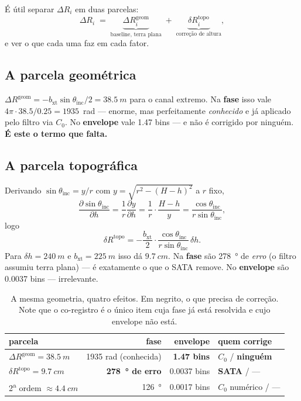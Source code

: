 \documentclass[11pt,a4paper]{article}
\newcommand{\bxt}{b_{\mathrm{xt}}}
\newcommand{\thi}{\theta_{\mathrm{inc}}}
\begin{document}
É útil separar $\Delta R_i$ em duas parcelas:
\begin{equation}
\Delta R_i \;=\;
\underbrace{\Delta R_i^{\mathrm{geom}}}_{\text{baseline, terra plana}}
\;+\;
\underbrace{\delta R_i^{\mathrm{topo}}}_{\text{correção de altura}},
\end{equation}
e ver o que cada uma faz em cada fator.

\subsection{A parcela geométrica}

$\Delta R^{\mathrm{geom}} = -\bxt\sin\thi/2 = \SI{38.5}{m}$ para o canal
extremo. Na \textbf{fase} isso vale
$4\pi\cdot\num{38.5}/\num{0.25} = \num{1935}$~rad --- enorme, mas
perfeitamente \emph{conhecido} e já aplicado pelo filtro via $C_0$. No
\textbf{envelope} vale \num{1.47} bins --- e não é corrigido por ninguém.
\textbf{É este o termo que falta.}

\subsection{A parcela topográfica}

Derivando $\sin\thi = y/r$ com $y = \sqrt{r^2-(H-h)^2}$ a $r$ fixo,
\begin{equation}
\frac{\partial \sin\thi}{\partial h}
= \frac{1}{r}\frac{\partial y}{\partial h}
= \frac{1}{r}\cdot\frac{H-h}{y}
= \frac{\cos\thi}{r\sin\thi},
\end{equation}
logo
\begin{equation}
\delta R^{\mathrm{topo}}
= -\frac{\bxt}{2}\cdot\frac{\cos\thi}{r\sin\thi}\,\delta h .
\label{eq:topo}
\end{equation}
Para $\delta h = \SI{240}{m}$ e $\bxt = \SI{225}{m}$ isso dá
$\SI{9.7}{cm}$. Na \textbf{fase} são \SI{278}{\degree} de \emph{erro} (o
filtro assumiu terra plana) --- é exatamente o que o SATA remove. No
\textbf{envelope} são \num{0.0037} bins --- irrelevante.

\begin{table}[h]
\centering
\begin{tabular}{lrrl}
\toprule
parcela & fase & envelope & quem corrige \\
\midrule
$\Delta R^{\mathrm{geom}} = \SI{38.5}{m}$ & \num{1935} rad (conhecida) & \textbf{\num{1.47} bins} & $C_0$ / \textbf{ninguém} \\
$\delta R^{\mathrm{topo}} = \SI{9.7}{cm}$ & \textbf{\SI{278}{\degree} de erro} & \num{0.0037} bins & \textbf{SATA} / --- \\
2\textsuperscript{a} ordem $\approx \SI{4.4}{cm}$ & \SI{126}{\degree} & \num{0.0017} bins & $C_0$ numérico / --- \\
\bottomrule
\end{tabular}
\caption{A mesma geometria, quatro efeitos. Em negrito, o que precisa de
correção. Note que o co-registro é o único item cuja fase já está resolvida
e cujo envelope não está.}
\label{tab:matriz}
\end{table}
\end{document}
